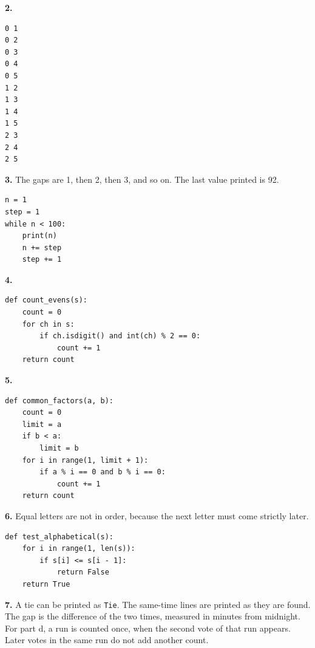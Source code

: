 \documentclass[11pt]{article}
\begin{document}
\textbf{2.}
\begin{lstlisting}
0 1
0 2
0 3
0 4
0 5
1 2
1 3
1 4
1 5
2 3
2 4
2 5
\end{lstlisting}

\textbf{3.} The gaps are 1, then 2, then 3, and so on. The last value printed is 92.

\begin{lstlisting}
n = 1
step = 1
while n < 100:
    print(n)
    n += step
    step += 1
\end{lstlisting}

\textbf{4.}
\begin{lstlisting}
def count_evens(s):
    count = 0
    for ch in s:
        if ch.isdigit() and int(ch) % 2 == 0:
            count += 1
    return count
\end{lstlisting}

\textbf{5.}
\begin{lstlisting}
def common_factors(a, b):
    count = 0
    limit = a
    if b < a:
        limit = b
    for i in range(1, limit + 1):
        if a % i == 0 and b % i == 0:
            count += 1
    return count
\end{lstlisting}

\textbf{6.} Equal letters are not in order, because the next letter must come strictly later.
\begin{lstlisting}
def test_alphabetical(s):
    for i in range(1, len(s)):
        if s[i] <= s[i - 1]:
            return False
    return True
\end{lstlisting}

\textbf{7.} A tie can be printed as \texttt{Tie}. The same-time lines are printed as they are found. The gap is the difference of the two times, measured in minutes from midnight. For part d, a run is counted once, when the second vote of that run appears. Later votes in the same run do not add another count.
\end{document}
